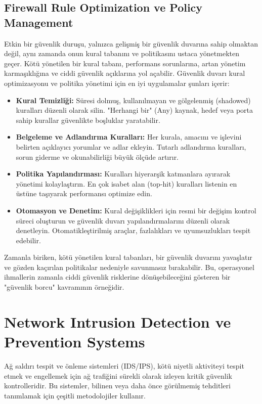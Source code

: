 \subsection{Firewall Rule Optimization ve Policy Management}

Etkin bir güvenlik duruşu, yalnızca gelişmiş bir güvenlik duvarına sahip olmaktan değil, aynı zamanda onun kural tabanını ve politikasını ustaca yönetmekten geçer. Kötü yönetilen bir kural tabanı, performans sorunlarına, artan yönetim karmaşıklığına ve ciddi güvenlik açıklarına yol açabilir.
Güvenlik duvarı kural optimizasyonu ve politika yönetimi için en iyi uygulamalar şunları içerir:

\begin{itemize}
\item \textbf{Kural Temizliği:} Süresi dolmuş, kullanılmayan ve gölgelenmiş (shadowed) kuralları düzenli olarak silin. "Herhangi bir" (Any) kaynak, hedef veya porta sahip kurallar güvenlikte boşluklar yaratabilir.
\item \textbf{Belgeleme ve Adlandırma Kuralları:} Her kurala, amacını ve işlevini belirten açıklayıcı yorumlar ve adlar ekleyin. Tutarlı adlandırma kuralları, sorun giderme ve okunabilirliği büyük ölçüde artırır.
\item \textbf{Politika Yapılandırması:} Kuralları hiyerarşik katmanlara ayırarak yönetimi kolaylaştırın. En çok isabet alan (top-hit) kuralları listenin en üstüne taşıyarak performansı optimize edin.
\item \textbf{Otomasyon ve Denetim:} Kural değişiklikleri için resmi bir değişim kontrol süreci oluşturun ve güvenlik duvarı yapılandırmalarını düzenli olarak denetleyin. Otomatikleştirilmiş araçlar, fazlalıkları ve uyumsuzlukları tespit edebilir.
\end{itemize}

Zamanla biriken, kötü yönetilen kural tabanları, bir güvenlik duvarını yavaşlatır ve gözden kaçırılan politikalar nedeniyle savunmasız bırakabilir. Bu, operasyonel ihmallerin zamanla ciddi güvenlik risklerine dönüşebileceğini gösteren bir "güvenlik borcu" kavramının örneğidir.

\section{Network Intrusion Detection ve Prevention Systems}

Ağ saldırı tespit ve önleme sistemleri (IDS/IPS), kötü niyetli aktiviteyi tespit etmek ve engellemek için ağ trafiğini sürekli olarak izleyen kritik güvenlik kontrolleridir. Bu sistemler, bilinen veya daha önce görülmemiş tehditleri tanımlamak için çeşitli metodolojiler kullanır.

